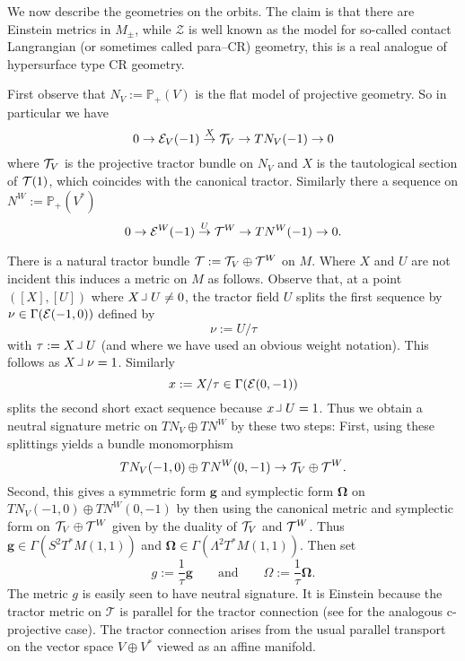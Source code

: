 We now describe the geometries on the orbits. The claim is that there
are Einstein metrics in $M_\pm$, while $\mathcal{Z}$ is well known as
the model for so-called contact Langrangian (or sometimes called
para--CR) geometry, this is a real analogue of hypersurface type CR
geometry.

First observe that $N_V:=\mathbb{P}_+(V)$
is the flat model of projective
geometry. So in particular we have
$$
0\to \mathcal{E}_V(-1)\stackrel{X}{\to}\mathcal{T}_V\to TN_V(-1)\to 0
$$
where $\mathcal{T}_V$ is the projective tractor bundle on $N_V$ and $X$ is the
tautological section of $\mathcal{T}(1)$, which coincides with the canonical tractor.
Similarly there a sequence on
$N^W:= \mathbb{P}_+(V^*)$
\begin{equation}\label{useful}
0\to \mathcal{E}^W(-1)\stackrel{U}{\to}\mathcal{T}^W \to TN^W(-1)\to 0 .
\end{equation}

There is a natural tractor bundle $\mathcal{T}:=\mathcal{T}_V\oplus \mathcal{T}^W $ on $M$. 
Where $X$ and $U$ are not incident this induces a metric on $M$ as
follows. Observe that, at a point $([X],[U])$ where $X\hook U \neq 0$, the  tractor field  $U$ splits the first sequence by $\nu\in \Gamma (\mathcal{E}(-1,0))$ defined by
$$
\nu:=U/\tau
$$
with $\tau:=X\hook U$ (and where we have used an obvious weight
notation). This follows as $X\hook \nu=1$. Similarly
$$
x:=X/\tau \in \Gamma (\mathcal{E}(0,-1))
$$
splits the second short exact sequence because $x \hook U=1$. Thus we
obtain a neutral signature metric on $TN_V\oplus TN^W$ by these
two steps: First, using  these splittings yields a bundle
monomorphism
$$
TN_V(-1,0)\oplus TN^W(0,-1) \to \mathcal{T}_V\oplus \mathcal{T}^W .
$$ Second, this gives a symmetric form $\boldsymbol{g}$ and symplectic form
$\boldsymbol{\Omega}$ on $TN_V(-1,0)\oplus TN^W(0,-1)$ by then using
the canonical metric and symplectic form on $\mathcal{T}_V\oplus \mathcal{T}^W $ given
by the duality of $\mathcal{T}_V$ and $ \mathcal{T}^W$. Thus $\boldsymbol{g}\in \Gamma
(S^2T^*M(1,1))$ and $\boldsymbol{\Omega}\in \Gamma
(\Lambda^2T^*M(1,1))$. Then set
$$ g:=\frac{1}{\tau}\boldsymbol{g} \qquad \mbox{and} \qquad  \Omega:=\frac{1}{\tau}\boldsymbol{\Omega}.
$$
The metric $g$ is easily seen to have neutral signature.  It is
Einstein because the tractor metric on $\mathcal{T}$ is parallel for the
tractor connection (see \cite{CGH-duke} for the analogous c-projective
case). The tractor connection arises from the usual parallel transport on the
vector space $V\oplus V^*$ viewed as an affine manifold.

